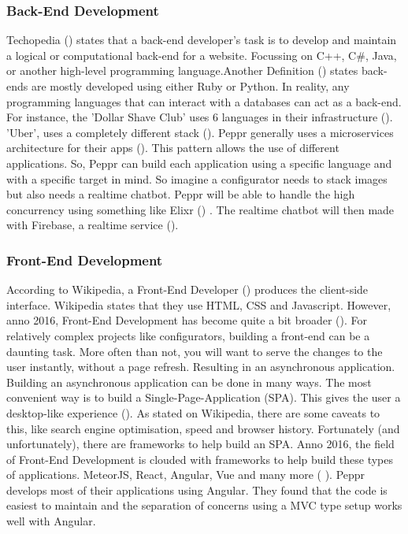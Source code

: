 \subsubsection{Back-End Development}
Techopedia (\cite{backendDevDefinition}) states that a back-end developer's task is to develop and maintain a logical or computational back-end for a website. Focussing on C++, C\#, Java, or another high-level programming language.Another Definition (\cite{backendDevDefinition}) states back-ends are mostly developed using either Ruby or Python.
In reality, any programming languages that can interact with a databases can act as a back-end. For instance, the 'Dollar Shave Club' uses 6 languages in their infrastructure (\cite{dollarShaveClubBackEnd}). 'Uber', uses a completely different stack (\cite{uberBackEnd}).
Peppr generally uses a microservices architecture for their apps (\cite{microservices}). This pattern allows the use of different applications. So, Peppr can build each application using a specific language and with a specific target in mind. So imagine a configurator needs to stack images but also needs a realtime chatbot. Peppr will be able to handle the high concurrency using something like Elixr (\cite{elixr}) . The realtime chatbot will then made with Firebase, a realtime service (\cite{firebase}).

\subsubsection{Front-End Development}
According to Wikipedia, a Front-End Developer (\cite{frontEndDevDefinition}) produces the client-side interface. Wikipedia states that they use HTML, CSS and Javascript. However, anno 2016, Front-End Development has become quite a bit broader (\cite{javascriptAnno2016}). For relatively complex projects like configurators, building a front-end can be a daunting task. More often than not, you will want to serve the changes to the user instantly, without a page refresh. Resulting in an asynchronous application.
Building an asynchronous application can be done in many ways. The most convenient way is to build a Single-Page-Application (SPA). This gives the user a desktop-like experience (\cite{singlePageApplications}). As stated on Wikipedia, there are some caveats to this, like search engine optimisation, speed and browser history. Fortunately (and unfortunately), there are frameworks to help build an SPA. Anno 2016, the field of Front-End Development is clouded with frameworks to help build these types of applications. MeteorJS, React, Angular, Vue and many more (\cite{frontEndJavascriptFrameworks} ).
Peppr develops most of their applications using Angular. They found that the code is easiest to maintain and the separation of concerns using a MVC type setup works well with Angular.

\newpage





